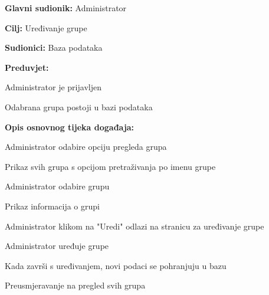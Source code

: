 \documentclass[times, utf8, zavrsni]{fer}
\newenvironment{packed_enum}{
	\begin{enumerate}
		\setlength{\itemsep}{0pt}
		\setlength{\parskip}{0pt}
		\setlength{\parsep}{0pt}
	}{\end{enumerate}}
\newenvironment{packed_item}{
	\begin{itemize}
		\setlength{\itemsep}{0pt}
		\setlength{\parskip}{0pt}
		\setlength{\parsep}{0pt}
	}{\end{itemize}}
\begin{document}
			\noindent {}
					\begin{packed_item}
						
						\item \textbf{Glavni sudionik: } Administrator
						\item  \textbf{Cilj:} Uređivanje grupe
						\item  \textbf{Sudionici:} Baza podataka
						\item  \textbf{Preduvjet:} 
						
						\item[] \begin{packed_enum}
							
							\item Administrator je prijavljen
							\item Odabrana grupa postoji u bazi podataka
							
							
						\end{packed_enum}
						
						\item  \textbf{Opis osnovnog tijeka događaja:}
						
						\item[] \begin{packed_enum}
							
							\item Administrator odabire opciju pregleda grupa
							\item Prikaz svih grupa s opcijom pretraživanja po imenu grupe
							\item Administrator odabire grupu
							\item Prikaz informacija o grupi
							\item Administrator klikom na "Uredi" odlazi na stranicu za uređivanje grupe
							\item Administrator uređuje grupe
							\item Kada završi s uređivanjem, novi podaci se pohranjuju u bazu
							\item Preusmjeravanje na pregled svih grupa
							
							
						\end{packed_enum}
						
					\end{packed_item}
					
\end{document}
